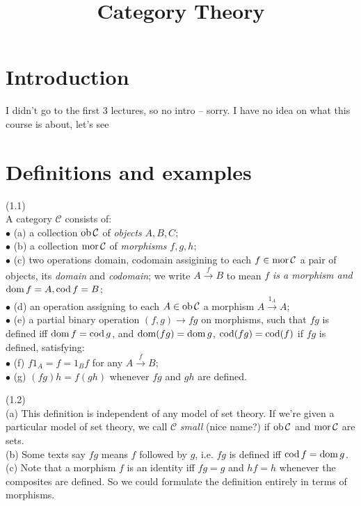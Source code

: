 \documentclass[a4paper]{article}
\begin{document}
\title{Category Theory}

\maketitle

\newpage

\tableofcontents

\newpage

\section{Introduction}
I didn't go to the first 3 lectures, so no intro -- sorry. I have no idea on what this course is about, let's see

\newpage

\section{Definitions and examples}
\begin{defi} (1.1)\\
    A category $\mathcal{C}$ consists of:\\
    $\bullet$ (a) a collection $\operatorname{ob}\mathcal{C}$ of \emph{objects} $A,B,C$;\\
    $\bullet$ (b) a collection $\operatorname{mor}\mathcal{C}$ of \emph{morphisms} $f,g,h$;\\
    $\bullet$ (c) two operations domain, codomain assigining to each $f \in \operatorname{mor}\mathcal{C}$ a pair of objects, its \emph{domain} and \emph{codomain}; we write $A \xrightarrow{f} B$ to mean \emph{$f$ is a morphism and $\operatorname{dom} f = A, \operatorname{cod} f = B$};\\
    $\bullet$ (d) an operation assigning to each $A \in \operatorname{ob}\mathcal{C}$ a morphism $A \xrightarrow{1_A} A$;\\
    $\bullet$ (e) a partial binary operation $(f,g) \to fg$ on morphisms, such that $fg$ is defined iff $\operatorname{dom} f = \operatorname{cod} g$, and $\operatorname{dom}(fg) = \operatorname{dom} g$, $\operatorname{cod}(fg) = \operatorname{cod}(f)$ if $fg$ is defined, satisfying:\\
    $\bullet$ (f) $f 1_A = f = 1_B f$ for any $A \xrightarrow{f} B$;\\
    $\bullet$ (g) $(fg) h = f(gh)$ whenever $fg$ and $gh$ are defined.
\end{defi}

\begin{rem} (1.2)\\
    (a) This definition is independent of any model of set theory. If we're given a particular model of set theory, we call $\mathcal{C}$ \emph{small} (nice name?) if $\operatorname{ob} \mathcal{C}$ and $\operatorname{mor}\mathcal{C}$ are sets.\\
    (b) Some texts say $fg$ means $f$ followed by $g$, i.e. $fg$ is defined iff $\operatorname{cod} f = \operatorname{dom} g$.\\
    (c) Note that a morphism $f$ is an identity iff $fg = g$ and $hf = h$ whenever the composites are defined. So we could formulate the definition entirely in terms of morphisms.
\end{rem}
\end{document}
